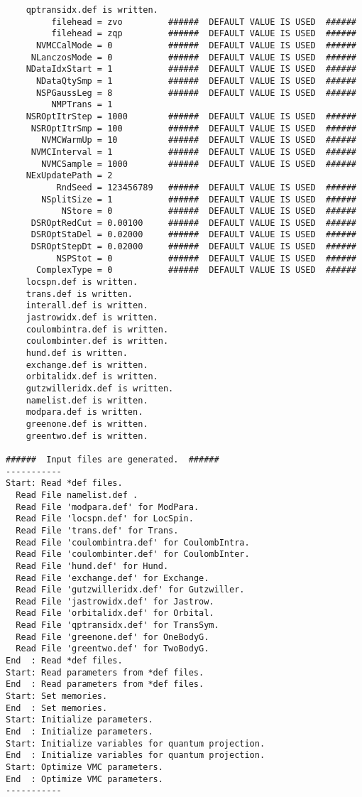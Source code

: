 \begin{verbatim}
    qptransidx.def is written.
         filehead = zvo         ######  DEFAULT VALUE IS USED  ######
         filehead = zqp         ######  DEFAULT VALUE IS USED  ######
      NVMCCalMode = 0           ######  DEFAULT VALUE IS USED  ######
     NLanczosMode = 0           ######  DEFAULT VALUE IS USED  ######
    NDataIdxStart = 1           ######  DEFAULT VALUE IS USED  ######
      NDataQtySmp = 1           ######  DEFAULT VALUE IS USED  ######
      NSPGaussLeg = 8           ######  DEFAULT VALUE IS USED  ######
         NMPTrans = 1         
    NSROptItrStep = 1000        ######  DEFAULT VALUE IS USED  ######
     NSROptItrSmp = 100         ######  DEFAULT VALUE IS USED  ######
       NVMCWarmUp = 10          ######  DEFAULT VALUE IS USED  ######
     NVMCInterval = 1           ######  DEFAULT VALUE IS USED  ######
       NVMCSample = 1000        ######  DEFAULT VALUE IS USED  ######
    NExUpdatePath = 2         
          RndSeed = 123456789   ######  DEFAULT VALUE IS USED  ######
       NSplitSize = 1           ######  DEFAULT VALUE IS USED  ######
           NStore = 0           ######  DEFAULT VALUE IS USED  ######
     DSROptRedCut = 0.00100     ######  DEFAULT VALUE IS USED  ######
     DSROptStaDel = 0.02000     ######  DEFAULT VALUE IS USED  ######
     DSROptStepDt = 0.02000     ######  DEFAULT VALUE IS USED  ######
          NSPStot = 0           ######  DEFAULT VALUE IS USED  ######
      ComplexType = 0           ######  DEFAULT VALUE IS USED  ######
    locspn.def is written.
    trans.def is written.
    interall.def is written.
    jastrowidx.def is written.
    coulombintra.def is written.
    coulombinter.def is written.
    hund.def is written.
    exchange.def is written.
    orbitalidx.def is written.
    gutzwilleridx.def is written.
    namelist.def is written.
    modpara.def is written.
    greenone.def is written.
    greentwo.def is written.

######  Input files are generated.  ######
-----------
Start: Read *def files.
  Read File namelist.def .
  Read File 'modpara.def' for ModPara.
  Read File 'locspn.def' for LocSpin.
  Read File 'trans.def' for Trans.
  Read File 'coulombintra.def' for CoulombIntra.
  Read File 'coulombinter.def' for CoulombInter.
  Read File 'hund.def' for Hund.
  Read File 'exchange.def' for Exchange.
  Read File 'gutzwilleridx.def' for Gutzwiller.
  Read File 'jastrowidx.def' for Jastrow.
  Read File 'orbitalidx.def' for Orbital.
  Read File 'qptransidx.def' for TransSym.
  Read File 'greenone.def' for OneBodyG.
  Read File 'greentwo.def' for TwoBodyG.
End  : Read *def files.
Start: Read parameters from *def files.
End  : Read parameters from *def files.
Start: Set memories.
End  : Set memories.
Start: Initialize parameters.
End  : Initialize parameters.
Start: Initialize variables for quantum projection.
End  : Initialize variables for quantum projection.
Start: Optimize VMC parameters.
End  : Optimize VMC parameters.
-----------
\end{verbatim}
\normalsize

